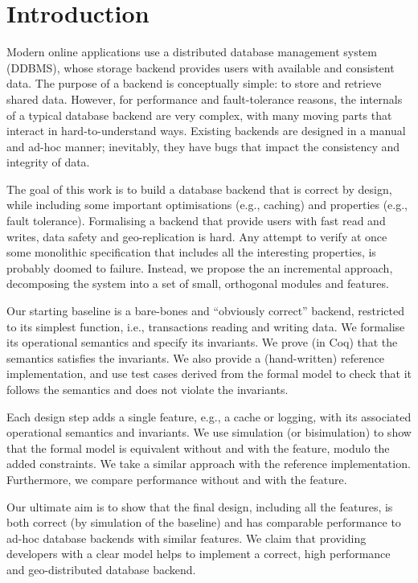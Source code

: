 \documentclass[systeme,french,english]{compas2022}
\begin{document}
\section{Introduction}

Modern online applications use a distributed database management system
(DDBMS), whose storage backend provides users with available and
consistent data.
The purpose of a backend is conceptually simple: to store and retrieve
shared data.
However, for performance and fault-tolerance reasons, the internals of a
typical database backend are very complex, with many moving parts that interact
in hard-to-understand ways.
Existing backends are designed in a manual and ad-hoc manner;
inevitably, they have bugs that impact the consistency and integrity of
data.

The goal of this work is to build a database backend that is correct by
design, while including some important optimisations (e.g., caching) and
properties (e.g., fault tolerance).
Formalising a backend that provide users with fast read and writes,
data safety and geo-replication is hard.
Any attempt to verify at once some monolithic specification that
includes all the interesting properties, is probably doomed to failure.
Instead, we propose the an incremental approach,  decomposing the
system into a set of small, orthogonal modules and features.

Our starting baseline is a bare-bones and ``obviously correct'' backend,
restricted to its simplest function, i.e., transactions reading and
writing data.
We formalise its operational semantics and specify its invariants.
We prove (in Coq) that the semantics satisfies the invariants.
We also provide a (hand-written) reference implementation, and use test
cases derived from the formal model to check that it follows the
semantics and does not violate the invariants.

Each design step adds a single feature, e.g., a cache or logging,
with its associated operational semantics and invariants.
We use simulation (or bisimulation) to show that the formal model is
equivalent without and with the feature, modulo the added constraints.
We take a similar approach with the reference implementation.
Furthermore, we compare performance without and with the feature.

Our ultimate aim is to show that the final design, including all the
features, is both correct (by simulation of the baseline) and has
comparable performance to ad-hoc database backends with similar features.
We claim that providing developers with a clear model helps to implement
a correct, high performance and geo-distributed database backend.
\end{document}

